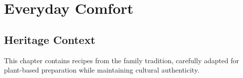 \chapter{Everyday Comfort}

\section*{Heritage Context}

This chapter contains recipes from the family tradition, carefully adapted for plant-based preparation while maintaining cultural authenticity.

% 

